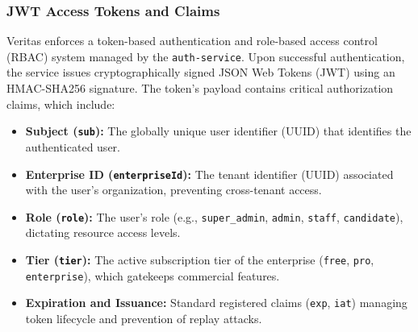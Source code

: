 \subsubsection{JWT Access Tokens and Claims}
Veritas enforces a token-based authentication and role-based access control (RBAC) system managed by the \texttt{auth-service}. Upon successful authentication, the service issues cryptographically signed JSON Web Tokens (JWT) using an HMAC-SHA256 signature. The token's payload contains critical authorization claims, which include:
\begin{itemize}
    \item \textbf{Subject (\texttt{sub}):} The globally unique user identifier (UUID) that identifies the authenticated user.
    \item \textbf{Enterprise ID (\texttt{enterpriseId}):} The tenant identifier (UUID) associated with the user's organization, preventing cross-tenant access.
    \item \textbf{Role (\texttt{role}):} The user's role (e.g., \texttt{super\_admin}, \texttt{admin}, \texttt{staff}, \texttt{candidate}), dictating resource access levels.
    \item \textbf{Tier (\texttt{tier}):} The active subscription tier of the enterprise (\texttt{free}, \texttt{pro}, \texttt{enterprise}), which gatekeeps commercial features.
    \item \textbf{Expiration and Issuance:} Standard registered claims (\texttt{exp}, \texttt{iat}) managing token lifecycle and prevention of replay attacks.
\end{itemize}

